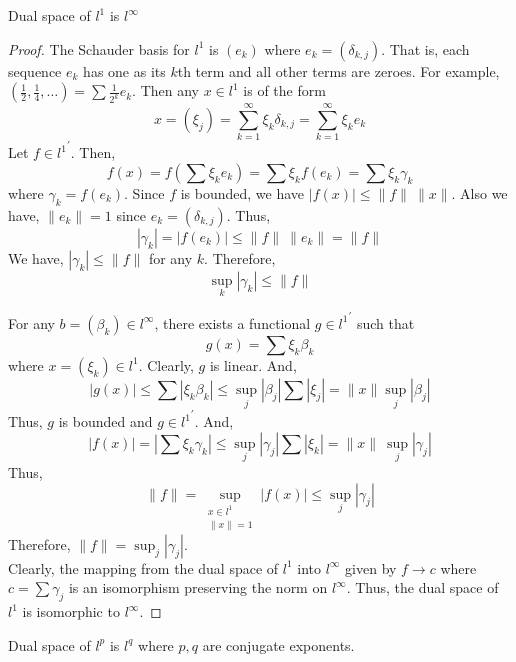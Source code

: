 \begin{important}
\begin{remark}
	Dual space of $l^1$ is $l^\infty$
\end{remark}
\end{important}
\begin{proof}
	The Schauder basis for $l^1$ is $(e_k)$ where $e_k = (\delta_{k,j})$.
	{\color{red} That is, each sequence $e_k$ has one as its $k$th term and all other terms are zeroes.
	For example, $(\frac{1}{2},\frac{1}{4},\dots) = \sum \frac{1}{2^k} e_k$.
	}
	Then any $x \in l^1$ is of the form
	\[ x = (\xi_j) = \sum_{k=1}^\infty \xi_k \delta_{k,j} = \sum_{k =1}^\infty \xi_k e_k \]
	Let $f \in {l^1}^\prime$.
	Then,
	\[ f(x) = f\left(\sum \xi_k e_k\right) = \sum \xi_k f(e_k) = \sum \xi_k \gamma_k \]
	where $\gamma_k = f(e_k)$.
	Since $f$ is bounded, we have $|f(x)| \le \|f\| \ \|x\|$.
	Also we have, $\|e_k\| = 1$ since $e_k = (\delta_{k,j})$.
	Thus,
	\[ |\gamma_k| = |f(e_k)| \le \|f\| \ \|e_k\| = \|f\| \]
	We have, $|\gamma_k| \le \|f\|$ for any $k$.
	Therefore,
	\[ \sup_k |\gamma_k| \le \|f\| \]

	For any $b = (\beta_k) \in l^\infty$, there exists a functional $g \in {l^1}^\prime$ such that
	\[ g(x) = \sum \xi_k \beta_k \]
	where $x = (\xi_k) \in l^1$.
	Clearly, $g$ is linear.
	And,
	\[ |g(x)| \le \sum |\xi_k \beta_k| \le \sup_j |\beta_j| \sum |\xi_j| = \|x\| \sup_j |\beta_j| \]
	Thus, $g$ is bounded and $g \in {l^1}^\prime$.
	And,
	\[ |f(x)| = \left| \sum \xi_k \gamma_k \right| \le \sup_j |\gamma_j| \sum |\xi_k| = \|x\| \ \sup_j |\gamma_j| \]
	Thus,
	\[ \|f\| = \sup_{\substack{x \in l^1\\ \|x\| =1 }} |f(x)| \le \sup_j |\gamma_j| \]
	Therefore, $\|f\| = \sup_j |\gamma_j|$.\\

	Clearly, the mapping from the dual space of ${l^1}$ into $l^\infty$ given by $f \to c$ where $c = \sum \gamma_j$ is an isomorphism preserving the norm on $l^\infty$.
	Thus, the dual space of $l^1$ is isomorphic to $l^\infty$.
\end{proof}
\begin{important}
\begin{remark}
	Dual space of $l^p$ is $l^q$ where $p,q$ are conjugate exponents.
\end{remark}
\end{important}
